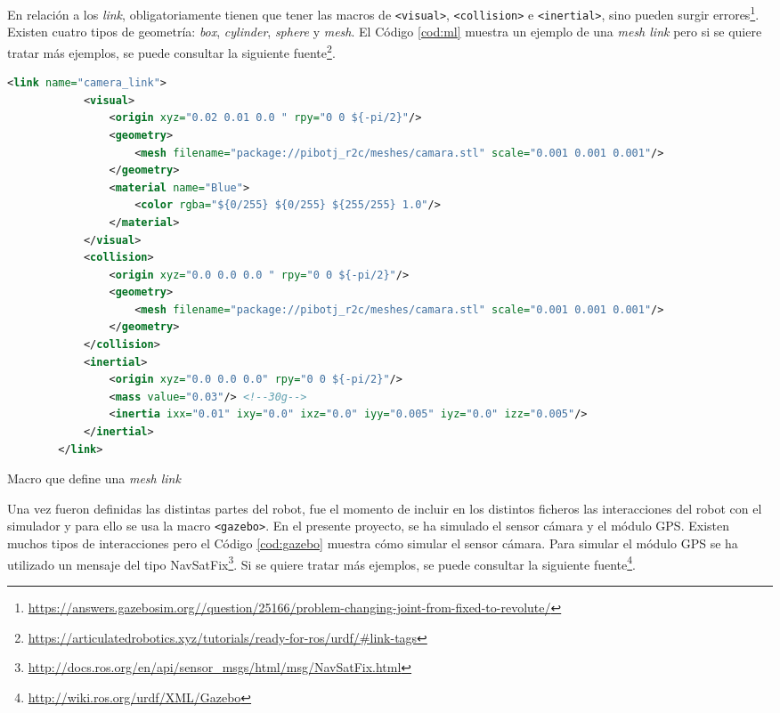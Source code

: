 En relación a los \textit{link}, obligatoriamente tienen que tener las macros de \verb|<visual>|, \verb|<collision>| e \verb|<inertial>|, sino pueden surgir errores\footnote{\url{https://answers.gazebosim.org//question/25166/problem-changing-joint-from-fixed-to-revolute/}}. Existen cuatro tipos de geometría: \textit{box}, \textit{cylinder}, \textit{sphere} y \textit{mesh}. El Código \ref{cod:ml} muestra un ejemplo de una \textit{mesh link} pero si se quiere tratar más ejemplos, se puede consultar la siguiente fuente\footnote{\url{https://articulatedrobotics.xyz/tutorials/ready-for-ros/urdf/\#link-tags}}.

\begin{code}[h]
	\begin{lstlisting}[language=xml]
		<link name="camera_link">
			<visual>
				<origin xyz="0.02 0.01 0.0 " rpy="0 0 ${-pi/2}"/>
				<geometry>
					<mesh filename="package://pibotj_r2c/meshes/camara.stl" scale="0.001 0.001 0.001"/>
				</geometry>
				<material name="Blue">
					<color rgba="${0/255} ${0/255} ${255/255} 1.0"/>
				</material>
			</visual>
			<collision> 
				<origin xyz="0.0 0.0 0.0 " rpy="0 0 ${-pi/2}"/>
				<geometry>
					<mesh filename="package://pibotj_r2c/meshes/camara.stl" scale="0.001 0.001 0.001"/>
				</geometry>
			</collision>
			<inertial>
				<origin xyz="0.0 0.0 0.0" rpy="0 0 ${-pi/2}"/>
				<mass value="0.03"/> <!--30g-->
				<inertia ixx="0.01" ixy="0.0" ixz="0.0" iyy="0.005" iyz="0.0" izz="0.005"/>
			</inertial>
		</link>
	\end{lstlisting}
	\caption[Macro que define una \textit{mesh link}]{Macro que define una \textit{mesh link}}
	\label{cod:ml}
\end{code}


Una vez fueron definidas las distintas partes del robot, fue el momento de incluir en los distintos ficheros las interacciones del robot con el simulador y para ello se usa la macro \verb|<gazebo>|. En el presente proyecto, se ha simulado el sensor cámara y el módulo \acs{GPS}. Existen muchos tipos de interacciones pero el Código \ref{cod:gazebo} muestra cómo simular el sensor cámara. Para simular el módulo GPS se ha utilizado un mensaje del tipo NavSatFix\footnote{\url{http://docs.ros.org/en/api/sensor_msgs/html/msg/NavSatFix.html}}. Si se quiere tratar más ejemplos, se puede consultar la siguiente fuente\footnote{\url{http://wiki.ros.org/urdf/XML/Gazebo}}.

